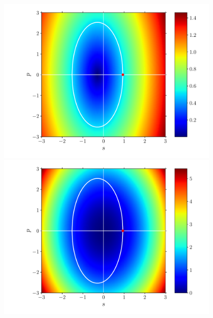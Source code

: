 \documentclass[fleqn]{goose-article}
\begin{document}
\begin{figure}[htp]
    \\
    \begin{minipage}[t]{.31\textwidth}
        \centering
        \includegraphics[width=\textwidth]{example_shear_phase-diagram_eps.pdf}
        \subcaption{$\varepsilon$}
    \end{minipage}
    \hfill
    \begin{minipage}[t]{.31\textwidth}
        \centering
        \includegraphics[width=\textwidth]{example_shear_phase-diagram_energy.pdf}
    \end{minipage}
    \hfill
    \begin{minipage}[t]{.31\textwidth}
        \centering

\end{minipage}
\end{figure}
\end{document}
